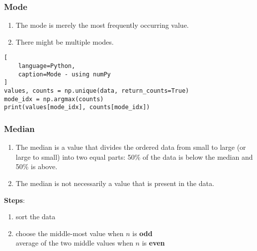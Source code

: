 \subsubsection{Mode \cite{statistics/book/Statistics-for-Data-Scientists/Maurits-Kaptein}} \label{Data/Describing Data/Central Tendency/Mode}

\begin{enumerate}
    \item The mode is merely the most frequently occurring value. \hfill \cite{statistics/book/Statistics-for-Data-Scientists/Maurits-Kaptein}

    \item There might be multiple modes. \hfill \cite{statistics/book/Statistics-for-Data-Scientists/Maurits-Kaptein}
    
\end{enumerate}

\begin{lstlisting}[
    language=Python, 
    caption=Mode - using numPy
]
values, counts = np.unique(data, return_counts=True)
mode_idx = np.argmax(counts)
print(values[mode_idx], counts[mode_idx])
\end{lstlisting}



\subsubsection{Median \cite{statistics/book/Statistics-for-Data-Scientists/Maurits-Kaptein}} \label{Data/Describing Data/Central Tendency/Median}

\begin{enumerate}
    \item The median is a value that divides the ordered data from small to large (or large to small) into two equal parts: 50\% of the data is below the median and 50\% is above.  \hfill \cite{statistics/book/Statistics-for-Data-Scientists/Maurits-Kaptein}

    \item The median is not necessarily a value that is present in the data. \hfill \cite{statistics/book/Statistics-for-Data-Scientists/Maurits-Kaptein}
\end{enumerate}


\vspace{0.3cm}
\textbf{Steps}: \hfill \cite{statistics/book/Statistics-for-Data-Scientists/Maurits-Kaptein}
\begin{enumerate}
    \item sort the data

    \item choose the middle-most value when $n$ is \textbf{odd}\\
        average of the two middle values when $n$ is \textbf{even}
\end{enumerate}


